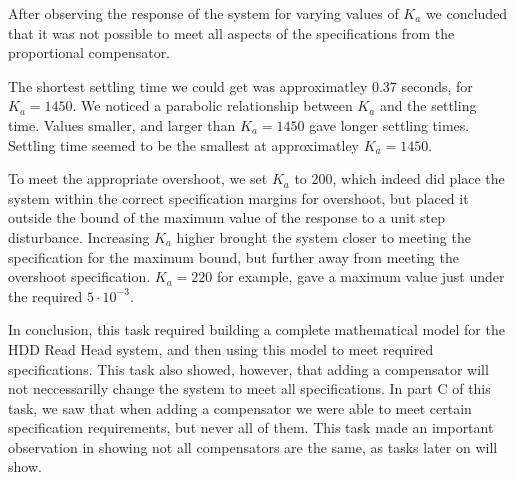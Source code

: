 \documentclass{article}
\begin{document}
After observing the response of the system for varying values of $K_a$ we
concluded that it was not possible to meet all aspects of the specifications
from the proportional compensator. 

The shortest settling time we could get was approximatley 0.37 seconds, for
$K_a = 1450$. We noticed a parabolic relationship between $K_a$ and the
settling time. Values smaller, and larger than $K_a = 1450$ gave longer
settling times. Settling time seemed to be the smallest at approximatley
$K_a = 1450$.

To meet the appropriate overshoot, we set $K_a$ to 200, which
indeed did place the system within the correct specification margins for
overshoot, but placed it outside the bound of the maximum value of the response
 to a unit step disturbance. Increasing $K_a$ higher brought the system
closer to meeting the specification for the maximum bound, but further away from
meeting the overshoot specification. $K_a = 220$ for example, gave a maximum
value just under the required $5\cdot10^{-3}$.


In conclusion, this task required building a complete mathematical model for
the HDD Read Head system, and then using this model to meet required
specifications. This task also showed, however, that adding a compensator will
not neccessarilly change the system to meet all specifications. In part C of
this task, we saw that when adding a compensator we were able to meet certain
specification requirements, but never all of them. This task made an important
observation in showing not all compensators are the same, as tasks later on
will show.

\end{document}
